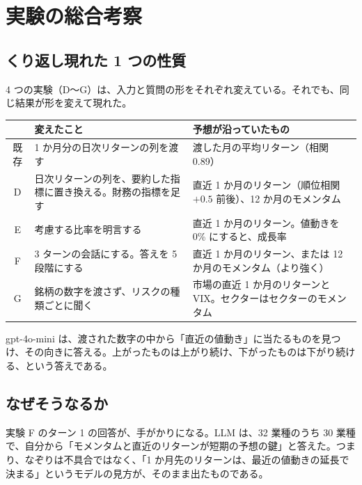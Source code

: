 \documentclass[xelatex,ja=standard,jafont=hiragino-pron,a4paper,10pt]{bxjsreport}
\begin{document}
\chapter{実験の総合考察}\label{ch:synthesis}

\section{くり返し現れた 1 つの性質}

4 つの実験（D〜G）は、入力と質問の形をそれぞれ変えている。それでも、同じ結果が形を変えて現れた。

\begin{longtable}{cp{5.20cm}p{8.40cm}}
\toprule
 & \textbf{変えたこと} & \textbf{予想が沿っていたもの} \\
\midrule
\endfirsthead
\bottomrule
\endfoot
既存 & 1 か月分の日次リターンの列を渡す & 渡した月の平均リターン（相関 0.89） \\
D & 日次リターンの列を、要約した指標に置き換える。財務の指標を足す & 直近 1 か月のリターン（順位相関 $+0.5$ 前後）、12 か月のモメンタム \\
E & 考慮する比率を明言する & 直近 1 か月のリターン。値動きを 0\% にすると、成長率 \\
F & 3 ターンの会話にする。答えを 5 段階にする & 直近 1 か月のリターン、または 12 か月のモメンタム（より強く） \\
G & 銘柄の数字を渡さず、リスクの種類ごとに聞く & 市場の直近 1 か月のリターンと VIX。セクターはセクターのモメンタム \\
\end{longtable}

\begin{keybox}[実験から言えること]
gpt-4o-mini は、渡された数字の中から「直近の値動き」に当たるものを見つけ、その向きに答える。上がったものは上がり続け、下がったものは下がり続ける、という答えである。
\end{keybox}

\section{なぜそうなるか}

実験 F のターン 1 の回答が、手がかりになる。LLM は、32 業種のうち 30 業種で、自分から「モメンタムと直近のリターンが短期の予想の鍵」と答えた。つまり、なぞりは不具合ではなく、「1 か月先のリターンは、最近の値動きの延長で決まる」というモデルの見方が、そのまま出たものである。
\end{document}
